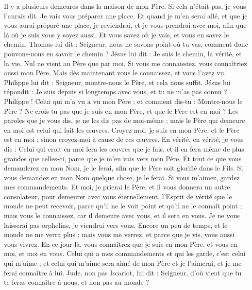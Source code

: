 \begin{multicols}{2}
Il y a plusieurs demeures dans la maison de mon Père. Si cela n'était pas, je vous l'aurais dit. Je vais vous préparer une place.
Et quand je m'en serai allé, et que je vous aurai préparé une place, je reviendrai, et je vous prendrai avec moi, afin que là où je suis vous y soyez aussi.
Et vous savez où je vais, et vous en savez le chemin.
Thomas lui dit : Seigneur, nous ne savons point où tu vas, comment donc pouvons-nous en savoir le chemin ?
Jésus lui dit : Je suis le chemin, la vérité, et la vie. Nul ne vient au Père que par moi.
Si vous me connaissiez, vous connaîtriez aussi mon Père. Mais dès maintenant vous le connaissez, et vous l'avez vu.
Philippe lui dit : Seigneur, montre-nous le Père, et cela nous suffit.
Jésus lui répondit : Je suis depuis si longtemps avec vous, et tu ne m'as pas connu ? Philippe ! Celui qui m'a vu a vu mon Père ; et comment dis-tu : Montre-nous le Père ?
Ne crois-tu pas que je suis en mon Père, et que le Père est en moi ? Les paroles que je vous dis, je ne les dis pas de moi-même ; mais le Père qui demeure en moi est celui qui fait les œuvres.
Croyez-moi, je suis en mon Père, et le Père est en moi ; sinon croyez-moi à cause de ces œuvres.
En vérité, en vérité, je vous dis : Celui qui croit en moi fera les œuvres que je fais, et il en fera même de plus grandes que celles-ci, parce que je m'en vais vers mon Père.
Et tout ce que vous demanderez en mon Nom, je le ferai, afin que le Père soit glorifié dans le Fils.
Si vous demandez en mon Nom quelque chose, je le ferai.
Si vous m'aimez, gardez mes commandements.
Et moi, je prierai le Père, et il vous donnera un autre consolateur, pour demeurer avec vous éternellement,
l'Esprit de vérité que le monde ne peut recevoir, parce qu'il ne le voit point et qu'il ne le connaît point ; mais vous le connaissez, car il demeure avec vous, et il sera en vous.
Je ne vous laisserai pas orphelins, je viendrai vers vous.
Encore un peu de temps, et le monde ne me verra plus ; mais vous me verrez, et parce que je vis, vous aussi vous vivrez.
En ce jour-là, vous connaîtrez que je suis en mon Père, et vous en moi, et moi en vous.
Celui qui a mes commandements et qui les garde, c'est celui qui m'aime ; et celui qui m'aime sera aimé de mon Père et je l'aimerai, et je me ferai connaître à lui.
Jude, non pas Iscariot, lui dit : Seigneur, d'où vient que tu te feras connaître à nous, et non pas au monde ?

\end{multicols}

